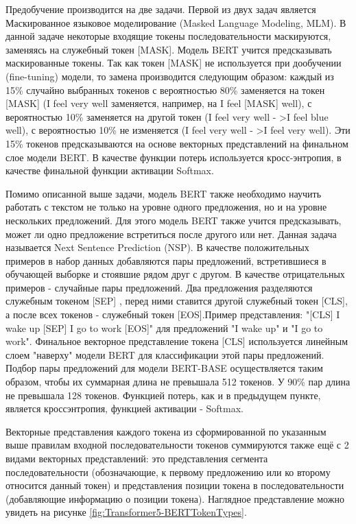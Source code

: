 Предобучение производится на две задачи. Первой из двух задач является Маскированное языковое моделирование (Masked Language Modeling, MLM). В данной задаче некоторые входящие токены последовательности маскируются, заменяясь на служебный токен [MASK]. Модель BERT учится предсказывать маскированные токены. Так как токен [MASK] не используется при дообучении (fine-tuning) модели, то замена производится следующим образом: каждый из 15\% случайно выбранных токенов с вероятностью 80\% заменяется на токен [MASK] (I feel very well заменяется, например, на I feel [MASK] well), с вероятностью 10\% заменяется на другой токен (I feel very well - >I feel blue well), с вероятностью 10\% не изменяется (I feel very well - >I feel very well). Эти 15\% токенов предсказываются на основе векторных представлений на финальном слое модели BERT. В качестве функции потерь используется кросс-энтропия, в качестве финальной функции активации Softmax. 

Помимо описанной выше задачи, модель BERT также необходимо научить работать с текстом не только на уровне одного предложения, но и на уровне нескольких предложений. Для этого модель BERT также учится предсказывать, может ли одно предложение встретиться после другого или нет. Данная задача называется Next Sentence Prediction (NSP). В качестве положительных примеров в набор данных добавляются пары предложений, встретившиеся в обучающей выборке и стоявшие рядом друг с другом. В качестве отрицательных примеров - случайные пары предложений.  Два предложения разделяются служебным токеном [SEP] , перед ними ставится другой служебный токен [CLS], а после всех токенов - служебный токен [EOS].Пример представления: "[CLS] I wake up [SEP] I go to work [EOS]" для предложений "I wake up" и  "I go to work". Финальное векторное представление токена [CLS] используется линейным слоем "наверху" модели BERT для классификации этой пары предложений. Подбор пары предложений для модели BERT-BASE осуществляется таким образом, чтобы их суммарная длина не превышала 512 токенов. У 90\% пар длина не превышала 128 токенов. Функцией потерь, как и в предыдущем пункте, является кроссэнтропия, функцией активации - Softmax.

Векторные представления каждого токена из сформированной по указанным выше правилам входной последовательности токенов суммируются также ещё с 2 видами векторных представлений: это представления сегмента последовательности (обозначающие, к первому предложению или ко второму относится данный токен) и представления позиции токена в последовательности (добавляющие информацию о позиции токена). Наглядное представление можно увидеть на рисунке \ref{fig:Transformer5-BERTTokenTypes}. 

